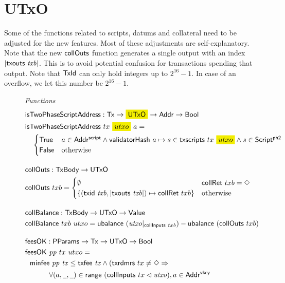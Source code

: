 \section{UTxO}
\label{sec:utxo}

Some of the functions related to scripts, datums and collateral need
to be adjusted for the new features. Most of these adjustments are
self-explanatory. Note that the new $\mathsf{collOuts}$ function
generates a single output with an index $| \mathsf{txouts}~ \mathit{txb} |$. This is to
avoid potential confusion for transactions spending that output. Note
that $\mathsf{TxId}$ can only hold integers up to $2^{16} - 1$. In case of an
overflow, we let this number be $2^{16} - 1$.

\begin{figure*}[htb]
  \emph{Functions}
  \begin{align*}
    & \fun{isTwoPhaseScriptAddress} : \Tx \to \hldiff{\UTxO} \to \Addr \to \Bool \\
    & \fun{isTwoPhaseScriptAddress}~tx~\hldiff{utxo}~a = \\
    &\quad\begin{cases}
        \True  & a \in \AddrScr \land \fun{validatorHash}~a \mapsto s \in \fun{txscripts}~tx~\hldiff{utxo} \land s \in \ScriptPhTwo \\
        \False & \text{otherwise}
      \end{cases}
    \nextdef
    & \fun{collOuts} : \TxBody \to \UTxO \\
    & \fun{collOuts}~txb =
      \begin{cases}
        \emptyset                                                      & \fun{collRet}~txb = \Nothing \\
        \{ (\txid{txb}, | \txouts{txb} |) \mapsto \fun{collRet}~txb \} & \text{otherwise}
      \end{cases}
    \nextdef
    & \fun{collBalance} : \TxBody \to \UTxO \to \Value \\
    & \fun{collBalance}~txb~utxo = \fun{ubalance}~(\var{utxo}|_{\fun{collInputs}~{txb}}) - \fun{ubalance}~(\fun{collOuts}~txb)
    \nextdef
    & \fun{feesOK} : \PParams \to \Tx \to \UTxO \to \Bool  \\
    & \fun{feesOK}~\var{pp}~tx~utxo = \\
    &~~      \minfee{pp}{tx} \leq \txfee{tx} \wedge (\fun{txrdmrs}~tx \neq \Nothing \Rightarrow \\
    &~~~~~~~~~~\forall (a, \wcard, \wcard) \in \fun{range}~(\fun{collInputs}~tx \restrictdom \var{utxo}), a \in \AddrVKey \\

\end{align*}
\end{figure*}
